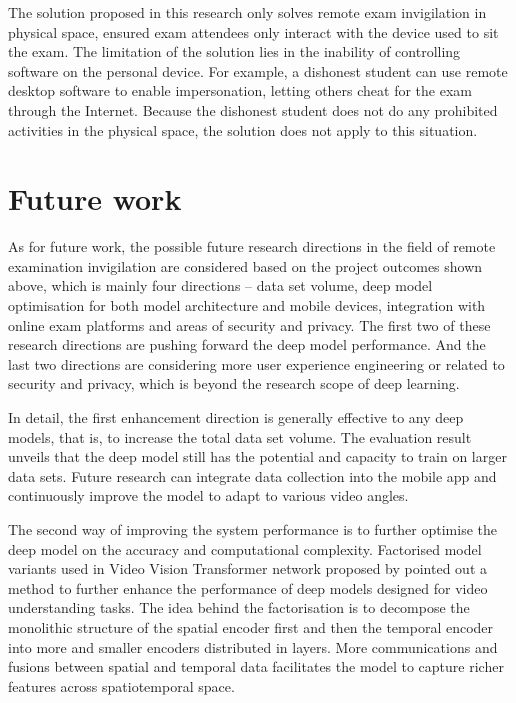 The solution proposed in this research only solves remote exam invigilation in physical space, ensured exam attendees only interact with the device used to sit the exam.
The limitation of the solution lies in the inability of controlling software on the personal device.
For example, a dishonest student can use remote desktop software to enable impersonation, letting others cheat for the exam through the Internet. 
Because the dishonest student does not do any prohibited activities in the physical space, the solution does not apply to this situation.

\section{Future work}
As for future work, the possible future research directions in the field of remote examination invigilation are considered based on the project outcomes shown above, which is mainly four directions -- data set volume, deep model optimisation for both model architecture and mobile devices, integration with online exam platforms and areas of security and privacy.
The first two of these research directions are pushing forward the deep model performance.
And the last two directions are considering more user experience engineering or related to security and privacy, which is beyond the research scope of deep learning.

In detail, the first enhancement direction is generally effective to any deep models, that is, to increase the total data set volume.
The evaluation result unveils that the deep model still has the potential and capacity to train on larger data sets.
Future research can integrate data collection into the mobile app and continuously improve the model to adapt to various video angles.

The second way of improving the system performance is to further optimise the deep model on the accuracy and computational complexity.
Factorised model variants used in Video Vision Transformer network proposed by \citet{arnab2021vivit} pointed out a method to further enhance the performance of deep models designed for video understanding tasks.
The idea behind the factorisation is to decompose the monolithic structure of the spatial encoder first and then the temporal encoder into more and smaller encoders distributed in layers.
More communications and fusions between spatial and temporal data facilitates the model to capture richer features across spatiotemporal space.

